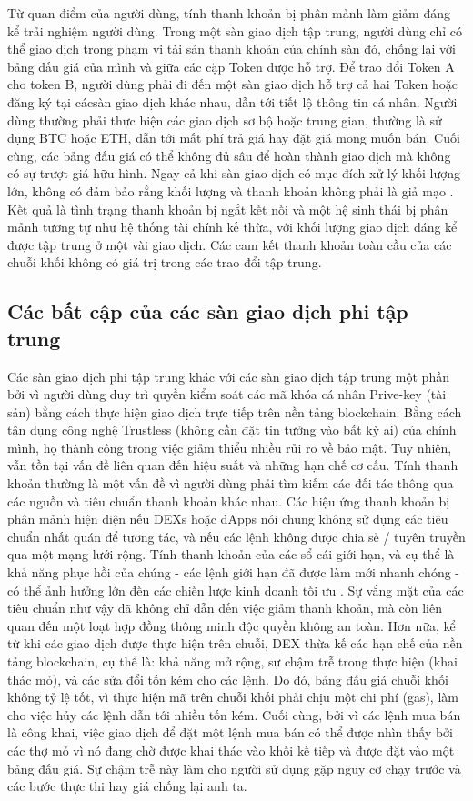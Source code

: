 \documentclass[12pt,a4paper]{article}
\begin{document}
\begin{multicols}{2}
Từ quan điểm của người dùng, tính thanh khoản bị phân mảnh làm giảm đáng kể trải nghiệm người dùng. Trong một sàn giao dịch tập trung, người dùng chỉ có thể giao dịch trong phạm vi tài sản thanh khoản của chính sàn đó, chống lại với bảng đấu giá của mình và giữa các cặp Token được hỗ trợ. Để trao đổi Token A cho token B, người dùng phải đi đến một sàn giao dịch hỗ trợ cả hai Token hoặc đăng ký tại cácsàn giao dịch khác nhau, dẫn tới tiết lộ thông tin cá nhân. Người dùng thường phải thực hiện các giao dịch sơ bộ hoặc trung gian, thường là sử dụng BTC hoặc ETH, dẫn tới mất phí trả giá hay đặt giá mong muốn bán. Cuối cùng, các bảng đấu giá có thể không đủ sâu để hoàn thành giao dịch mà không có sự trượt giá hữu hình. Ngay cả khi sàn giao dịch có mục đích xử lý khối lượng lớn, không có đảm bảo rằng khối lượng và thanh khoản không phải là giả mạo \cite{dai2017smart}.
Kết quả là tình trạng thanh khoản bị ngắt kết nối và một hệ sinh thái bị phân mảnh tương tự như hệ thống tài chính kế thừa, với khối lượng giao dịch đáng kể được tập trung ở một vài giao dịch. Các cam kết thanh khoản toàn cầu của các chuỗi khối không có giá trị trong các trao đổi tập trung.
\subsection{Các bất cập của các sàn giao dịch phi tập trung}
Các sàn giao dịch phi tập trung khác với các sàn giao dịch tập trung một phần bởi vì người dùng duy trì quyền kiểm soát các mã khóa cá nhân Prive-key (tài sản) bằng cách thực hiện giao dịch trực tiếp trên nền tảng blockchain. Bằng cách tận dụng công nghệ Trustless (không cần đặt tin tưởng vào bất kỳ ai) của chính mình, họ thành công trong việc giảm thiểu nhiều rủi ro về bảo mật. Tuy nhiên, vẫn tồn tại vấn đề liên quan đến hiệu suất và những hạn chế cơ cấu.
Tính thanh khoản thường là một vấn đề vì người dùng phải tìm kiếm các đối tác thông qua các nguồn và tiêu chuẩn thanh khoản khác nhau. Các hiệu ứng thanh khoản bị phân mảnh hiện diện nếu DEXs hoặc dApps nói chung không sử dụng các tiêu chuẩn nhất quán để tương tác, và nếu các lệnh không được chia sẻ / tuyên truyền qua một mạng lưới rộng. Tính thanh khoản của các sổ cái giới hạn, và cụ thể là khả năng phục hồi của chúng - các lệnh giới hạn đã được làm mới nhanh chóng - có thể ảnh hưởng lớn đến các chiến lược kinh doanh tối ưu \cite{atterlonn2018distributed}. Sự vắng mặt của các tiêu chuẩn như vậy đã không chỉ dẫn đến việc giảm thanh khoản, mà còn liên quan đến một loạt hợp đồng thông minh độc quyền không an toàn.
Hơn nữa, kể từ khi các giao dịch được thực hiện trên chuỗi, DEX thừa kế các hạn chế của nền tảng blockchain, cụ thể là: khả năng mở rộng, sự chậm trễ trong thực hiện (khai thác mỏ), và các sửa đổi tốn kém cho các lệnh. Do đó, bảng đấu giá chuỗi khối không tỷ lệ tốt, vì thực hiện mã trên chuỗi khối phải chịu một chi phí (gas), làm cho việc hủy các lệnh dẫn tới nhiều tốn kém.
Cuối cùng, bởi vì các lệnh mua bán là công khai, việc giao dịch để đặt một lệnh mua bán có thể được nhìn thấy bởi các thợ mỏ vì nó đang chờ được khai thác vào khối kế tiếp và được đặt vào một bảng đấu giá. Sự chậm trễ này làm cho người sử dụng gặp nguy cơ chạy trước và các bước thực thi hay giá chống lại anh ta.

\end{multicols}
\end{document}

